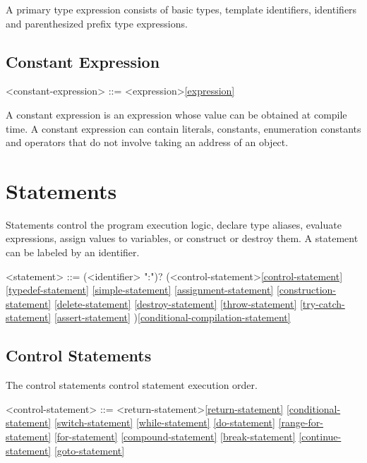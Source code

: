 \documentclass[a4paper,oneside,11pt]{article}
\begin{document}
A primary type expression consists of basic types, template identifiers, identifiers and parenthesized
prefix type expressions.

\subsection{Constant Expression}

\begin{grammar}
\label{constant-expression}<constant-expression> ::= <expression>\ref{expression}
\end{grammar}

A constant expression is an expression whose value can be obtained at compile time.
A constant expression can contain literals, constants, enumeration constants and operators that
do not involve taking an address of an object.

\section{Statements}

Statements control the program execution logic, declare type aliases, evaluate expressions,
assign values to variables, or construct or destroy them.
A statement can be labeled by an identifier.

\begin{grammar}
\label{statement}<statement> ::= (<identifier> ":")? (<control-statement>\ref{control-statement}
\ref{typedef-statement}
\ref{simple-statement}
\ref{assignment-statement}
\ref{construction-statement}
\ref{delete-statement}
\ref{destroy-statement}
\ref{throw-statement}
\ref{try-catch-statement}
\ref{assert-statement}
)\ref{conditional-compilation-statement}
\end{grammar}

\subsection{Control Statements}

The control statements control statement execution order.

\begin{grammar}
\label{control-statement}<control-statement> ::= <return-statement>\ref{return-statement}
\ref{conditional-statement}
\ref{switch-statement}
\ref{while-statement}
\ref{do-statement}
\ref{range-for-statement}
\ref{for-statement}
\ref{compound-statement}
\ref{break-statement}
\ref{continue-statement}
\ref{goto-statement}
\end{grammar}
\end{document}

